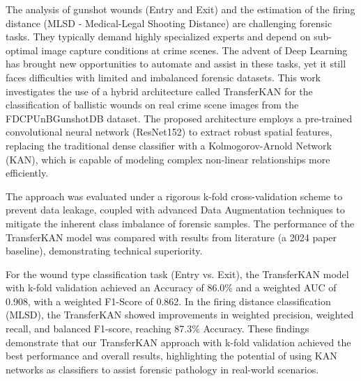 The analysis of gunshot wounds (Entry and Exit) and the estimation of the firing distance (MLSD - Medical-Legal Shooting Distance) are challenging forensic tasks. They typically demand highly specialized experts and depend on sub-optimal image capture conditions at crime scenes. The advent of Deep Learning has brought new opportunities to automate and assist in these tasks, yet it still faces difficulties with limited and imbalanced forensic datasets.
This work investigates the use of a hybrid architecture called TransferKAN for the classification of ballistic wounds on real crime scene images from the FDCPUnBGunshotDB dataset. The proposed architecture employs a pre-trained convolutional neural network (ResNet152) to extract robust spatial features, replacing the traditional dense classifier with a Kolmogorov-Arnold Network (KAN), which is capable of modeling complex non-linear relationships more efficiently.

The approach was evaluated under a rigorous k-fold cross-validation scheme to prevent data leakage, coupled with advanced Data Augmentation techniques to mitigate the inherent class imbalance of forensic samples. The performance of the TransferKAN model was compared with results from literature (a 2024 paper baseline), demonstrating technical superiority.

For the wound type classification task (Entry vs. Exit), the TransferKAN model with k-fold validation achieved an Accuracy of 86.0\% and a weighted AUC of 0.908, with a weighted F1-Score of 0.862. In the firing distance classification (MLSD), the TransferKAN showed improvements in weighted precision, weighted recall, and balanced F1-score, reaching 87.3\% Accuracy. These findings demonstrate that our TransferKAN approach with k-fold validation achieved the best performance and overall results, highlighting the potential of using KAN networks as classifiers to assist forensic pathology in real-world scenarios.
